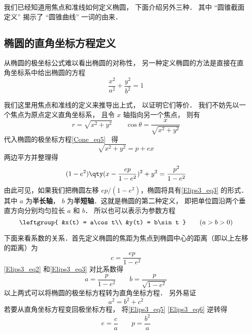 

我们已经知道用焦点和准线如何定义椭圆， 下面介绍另外三种． 其中 “圆锥截面定义” 揭示了 “圆锥曲线” 一词的由来．

\subsection{椭圆的直角坐标方程定义}
从椭圆的极坐标公式难以看出椭圆的对称性， 另一种定义椭圆的方法是直接在直角坐标系中给出椭圆的方程
\begin{equation}\label{Elips3_eq3}
\frac{x^2}{a^2} + \frac{y^2}{b^2} = 1
\end{equation}

我们这里用焦点和准线的定义来推导出上式， 以证明它们等价． 我们不妨先以一个焦点为原点定义直角坐标系， 且令 $x$ 轴指向另一个焦点， 则有
\begin{equation}
r = \sqrt{x^2 + y^2} \qquad \cos\theta = \frac{x}{\sqrt{x^2 + y^2}}
\end{equation}
代入椭圆的极坐标方程\autoref{Cone_eq5}~ 得
\begin{equation}
\sqrt{x^2 + y^2} = p + ex
\end{equation}
两边平方并整理得
\begin{equation}\label{Elips3_eq2}
(1 - e^2) \qty( x - \frac{ep}{1 - e^2} )^2 + y^2 = \frac{p^2}{1 - e^2}
\end{equation}
由此可见，如果我们把椭圆左移 $ep/(1 - e^2)$，椭圆将具有\autoref{Elips3_eq3} 的形式． 其中 $a$ 为\textbf{半长轴}， $b$ 为\textbf{半短轴}．这就是椭圆的第二种定义， 即把单位圆沿两个垂直方向分别均匀拉长 $a$ 和 $b$． 所以也可以表示为参数方程
\begin{equation}\label{Elips3_eq1}
\leftgroup{
&x(t) = a\cos t\\
&y(t) = b\sin t
} \qquad
(a > b > 0)
\end{equation}

下面来看系数的关系．首先定义椭圆的焦距为焦点到椭圆中心的距离（即以上左移的距离）为
\begin{equation}\label{Elips3_eq5}
c = \frac{ep}{1 - e^2}
\end{equation}
\autoref{Elips3_eq2} 和\autoref{Elips3_eq3} 对比系数得
\begin{equation}\label{Elips3_eq6}
a = \frac{p}{1 - e^2} \qquad b = \frac{p}{\sqrt {1 - e^2} }
\end{equation}
以上两式可以将椭圆的极坐标方程转为直角坐标方程． 另外易证
\begin{equation}\label{Elips3_eq7}
a^2 = b^2 + c^2
\end{equation}
若要从直角坐标方程变回极坐标方程， 将\autoref{Elips3_eq5} \autoref{Elips3_eq6} 逆转得
\begin{equation}\label{Elips3_eq8}
e = \frac{c}{a}\qquad
p = \frac{b^2}{a}
\end{equation}

